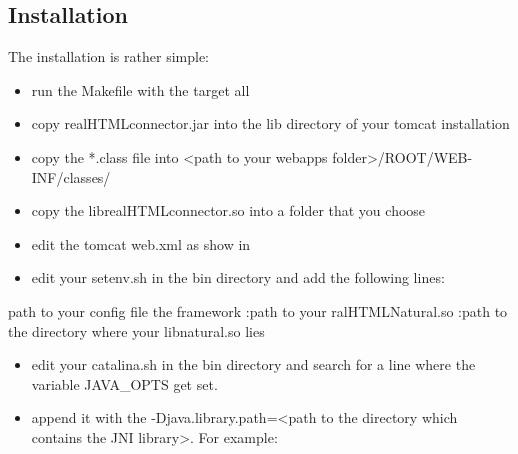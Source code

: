 \documentclass[letterpaper,10pt,english]{sphinxmanual}
\begin{document}
\subsection{Installation}
\label{\detokenize{connector:installation}}
The installation is rather simple:
\begin{itemize}
\item {} 
run the Makefile with the target \sphinxquotedblleft{}all\sphinxquotedblright{}

\item {} 
copy realHTMLconnector.jar into the lib directory of your tomcat installation

\item {} 
copy the *.class file into \sphinxquotedblleft{}\textless{}path to your webapps folder\textgreater{}/ROOT/WEB-INF/classes/\sphinxquotedblright{}

\item {} 
copy the librealHTMLconnector.so into a folder that you choose

\item {} 
edit the tomcat web.xml as show in {\hyperref[\detokenize{connector:tomcat-servlet}]{}}

\item {} 
edit your setenv.sh in the bin directory and add the following lines:

\end{itemize}

\begin{sphinxVerbatim}[commandchars=\\\{\}]
 \PYGZlt{}path to your config file  the framework\PYGZgt{}
 :\PYGZlt{}path to your ralHTMLNatural.so\PYGZgt{}
 :\PYGZlt{}path to the directory where your libnatural.so lies\PYGZgt{}
\end{sphinxVerbatim}
\begin{itemize}
\item {} 
edit your catalina.sh in the bin directory and search for a line where the variable \sphinxquotedblleft{}JAVA\_OPTS\sphinxquotedblright{} get set.

\item {} 
append it with the \sphinxquotedblleft{}-Djava.library.path=\textless{}path to the directory which contains the JNI library\textgreater{}\sphinxquotedblright{}. For example:

\end{itemize}
\end{document}
